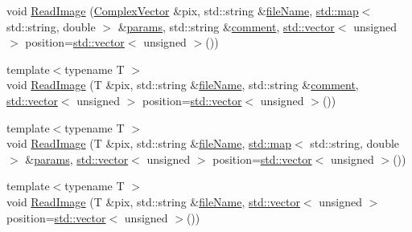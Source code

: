 \begin{DoxyCompactItemize}
\item 
void \hyperlink{class_q_s_t_e_m_1_1_c_image_i_o_a258072ab925c9904f10e88017b37c508}{Read\-Image} (\hyperlink{namespace_q_s_t_e_m_af210a2c1f9afae1deed746dcd9276221}{Complex\-Vector} \&pix, std\-::string \&\hyperlink{qmb_8m_a7a230f02bdffebd1357e3c0b49e01271}{file\-Name}, \hyperlink{_displacement_params_8m_af619c74fd72bdb64d115463dff2720cd}{std\-::map}$<$ std\-::string, double $>$ \&\hyperlink{image_sim_8m_ad57b218fb254a1624c09ad71cb6b6415}{params}, std\-::string \&\hyperlink{image_sim_8m_aea4cc4bd8e43a7f8ebf9b0ee3da8d681}{comment}, \hyperlink{qmb_8m_af54b69a32590de218622e869b06b47b3}{std\-::vector}$<$ unsigned $>$ position=\hyperlink{qmb_8m_af54b69a32590de218622e869b06b47b3}{std\-::vector}$<$ unsigned $>$())
\item 
{\footnotesize template$<$typename T $>$ }\\void \hyperlink{class_q_s_t_e_m_1_1_c_image_i_o_a0d360e6a7b5ae8bb95a902f611859d68}{Read\-Image} (T \&pix, std\-::string \&\hyperlink{qmb_8m_a7a230f02bdffebd1357e3c0b49e01271}{file\-Name}, std\-::string \&\hyperlink{image_sim_8m_aea4cc4bd8e43a7f8ebf9b0ee3da8d681}{comment}, \hyperlink{qmb_8m_af54b69a32590de218622e869b06b47b3}{std\-::vector}$<$ unsigned $>$ position=\hyperlink{qmb_8m_af54b69a32590de218622e869b06b47b3}{std\-::vector}$<$ unsigned $>$())
\item 
{\footnotesize template$<$typename T $>$ }\\void \hyperlink{class_q_s_t_e_m_1_1_c_image_i_o_a5751f80f17ee382e6391d9daa535df01}{Read\-Image} (T \&pix, std\-::string \&\hyperlink{qmb_8m_a7a230f02bdffebd1357e3c0b49e01271}{file\-Name}, \hyperlink{_displacement_params_8m_af619c74fd72bdb64d115463dff2720cd}{std\-::map}$<$ std\-::string, double $>$ \&\hyperlink{image_sim_8m_ad57b218fb254a1624c09ad71cb6b6415}{params}, \hyperlink{qmb_8m_af54b69a32590de218622e869b06b47b3}{std\-::vector}$<$ unsigned $>$ position=\hyperlink{qmb_8m_af54b69a32590de218622e869b06b47b3}{std\-::vector}$<$ unsigned $>$())
\item 
{\footnotesize template$<$typename T $>$ }\\void \hyperlink{class_q_s_t_e_m_1_1_c_image_i_o_afe1b20c89325e11eda002c1448a3685a}{Read\-Image} (T \&pix, std\-::string \&\hyperlink{qmb_8m_a7a230f02bdffebd1357e3c0b49e01271}{file\-Name}, \hyperlink{qmb_8m_af54b69a32590de218622e869b06b47b3}{std\-::vector}$<$ unsigned $>$ position=\hyperlink{qmb_8m_af54b69a32590de218622e869b06b47b3}{std\-::vector}$<$ unsigned $>$())
\end{DoxyCompactItemize}


